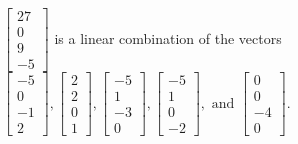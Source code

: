\begin{exercise}
\begin{exerciseStatement}
  \end{exerciseStatement}
  \begin{exerciseAnswer}
   \(\left[\begin{array}{c}
27 \\
0 \\
9 \\
-5
\end{array}\right]\) 
  	 is  
	a linear combination of the vectors \(\left[\begin{array}{c}
-5 \\
0 \\
-1 \\
2
\end{array}\right] , \left[\begin{array}{c}
2 \\
2 \\
0 \\
1
\end{array}\right] , \left[\begin{array}{c}
-5 \\
1 \\
-3 \\
0
\end{array}\right] , \left[\begin{array}{c}
-5 \\
1 \\
0 \\
-2
\end{array}\right] , \text{ and } \left[\begin{array}{c}
0 \\
0 \\
-4 \\
0
\end{array}\right]\).

	
  


  \end{exerciseAnswer}
\end{exercise}